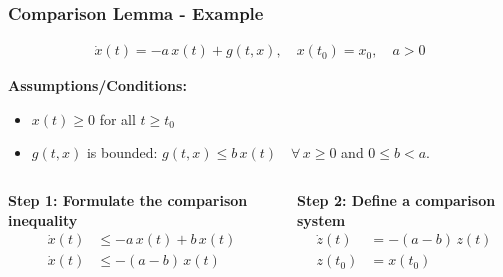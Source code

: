 \documentclass[student, noshadow, lsr, english, aspectratio=169, t]{ITR_LSR_slides}
\begin{document}

\begin{frame}
    \frametitle{Comparison Lemma - Example}

    \vspace{-0.5cm}
    \begin{tcolorbox}[title=Problem: Analyze stability of a scalar perturbed system]
        \vspace{-0.4cm}
        \begin{align*}
            \dot{x}(t) = -a\,x(t) + g(t, x), \quad x(t_0) = x_0, \quad a > 0
        \end{align*}
    \end{tcolorbox}

    \textbf{Assumptions/Conditions:}
    \begin{itemize}
        \item $x(t) \geq 0$ for all $t \geq t_0$
        \item $g(t, x)$ is bounded: $g(t, x) \leq b\,x(t) \quad \forall\, x \geq 0$ and $0 \leq b < a$.
    \end{itemize}

    \vspace{0.3cm}
    \begin{columns}
        \textbf{Step 1: Formulate the comparison inequality}
        \begin{align*}
            \dot{x}(t) &\leq -a\,x(t) + b\,x(t) \\[0.3cm]
            \dot{x}(t) &\leq -(a - b)\,x(t)
        \end{align*}

        \textbf{Step 2: Define a comparison system} \\
        \begin{align*}
            \dot{z}(t) &= -(a - b)\,z(t) \\[0.3cm]
            z(t_0) &= x(t_0)
        \end{align*}
    \end{columns}
    
\end{frame}
\end{document}
